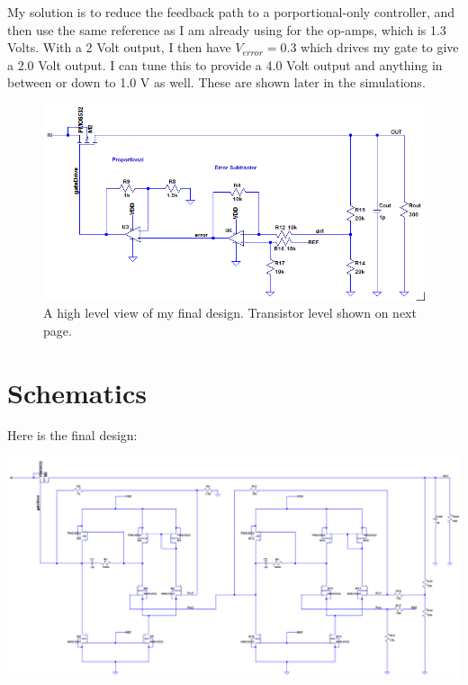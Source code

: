 \documentclass[10pt]{amsart}
\begin{document}
My solution is to reduce the feedback path to a porportional-only controller, and then use the same reference as I am already using for the op-amps, which is 1.3 Volts. With a 2 Volt output, I then have $V_{error} = 0.3$ which drives my gate to give a 2.0 Volt output. I can tune this to provide a 4.0 Volt output and anything in between or down to 1.0 V as well. These are shown later in the simulations.

\begin{figure}[h]
	\begin{center}
		\includegraphics[width=7in]{Media/cleanfinal.png}
	\end{center}
	\caption{A high level view of my final design. Transistor level shown on next page.}
	\label{fig:pidfb}
\end{figure}

\newpage

\section{Schematics}

Here is the final design:
	\begin{center}
		\includegraphics[width=6.0in, angle=90]{Media/design.png}
	\end{center}
\end{document}
